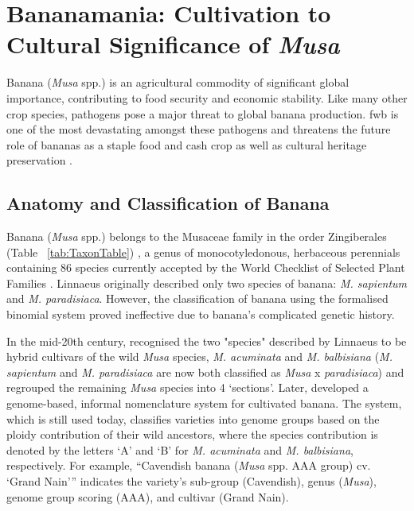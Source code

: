 \section{Bananamania: Cultivation to Cultural Significance of \textit{Musa}}

Banana (\textit{Musa} spp.) is an agricultural commodity of significant global importance, contributing to food security and economic stability. Like many other crop species, pathogens pose a major threat to global banana production. \acf{fwb} is one of the most devastating amongst these pathogens and threatens the future role of bananas as a staple food and cash crop as well as cultural heritage preservation \parencite{Kema2021}. 

\subsection{Anatomy and Classification of Banana}  

Banana (\textit{Musa} spp.) belongs to the Musaceae family in the order Zingiberales (Table ~\ref{tab:TaxonTable}) \parencite{Schoch2020}, a genus of monocotyledonous, herbaceous perennials containing 86 species currently accepted by the World Checklist of Selected Plant Families \parencite{WCSPF2023}. Linnaeus originally described only two species of banana: \textit{M. sapientum }and \textit{M. paradisiaca}. However, the classification of banana using the formalised binomial system proved ineffective due to banana’s complicated genetic history.

In the mid-20th century, \textcite{Cheesman1947} recognised the two "species" described by Linnaeus to be hybrid cultivars of the wild \textit{Musa} species, \textit{M. acuminata} and \textit{M. balbisiana} (\textit{M. sapientum} and \textit{M. paradisiaca} are now both classified as \textit{Musa} x \textit{paradisiaca}) and regrouped the remaining \textit{Musa} species into 4 ‘sections’. Later, \textcite{Simmonds1955} developed a genome-based, informal nomenclature system for cultivated banana. The system, which is still used today, classifies varieties into genome groups based on the ploidy contribution of their wild ancestors, where the species contribution is denoted by the letters ‘A’ and ‘B’ for \textit{M. acuminata} and \textit{M. balbisiana}, respectively. For example, “Cavendish banana (\textit{Musa } spp. AAA group) cv. ‘Grand Nain’” indicates the variety’s sub-group (Cavendish), genus (\textit{Musa}), genome group scoring (AAA), and cultivar (Grand Nain).

